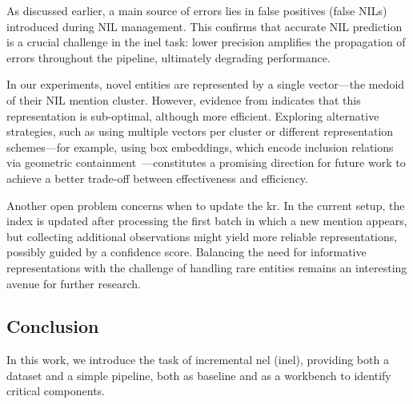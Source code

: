 As discussed earlier, a main source of errors lies in false positives (false NILs) introduced during NIL management. This confirms that accurate NIL prediction is a crucial challenge in the \ac{inel} task: lower precision amplifies the propagation of errors throughout the pipeline, ultimately degrading performance.


In our experiments, novel entities are represented by a single vector---the medoid of their NIL mention cluster. However, evidence from  indicates that this representation is sub-optimal, although more efficient. Exploring alternative strategies, such as using multiple vectors per cluster or different representation schemes---for example, using box embeddings, which encode inclusion relations via geometric containment~\cite{atzeni-etal-2023-polar}---constitutes a promising direction for future work to achieve a better trade-off between effectiveness and efficiency.

Another open problem concerns when to update the \ac{kr}. In the current setup, the index is updated after processing the first batch in which a new mention appears, but collecting additional observations might yield more reliable representations, possibly guided by a confidence score.
Balancing the need for informative representations with the challenge of handling rare entities remains an interesting avenue for further research.


\subsection{Conclusion}
In this work, we introduce the task of incremental \ac{nel} (\ac{inel}), providing both a dataset and a simple pipeline, both as baseline and as a workbench to identify critical components.

